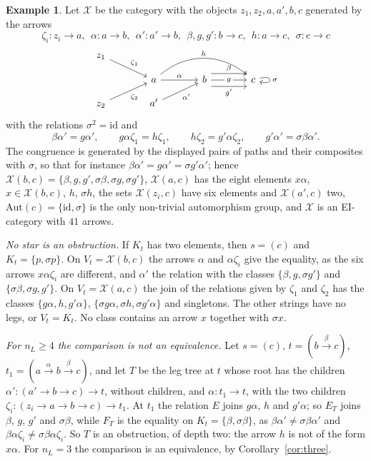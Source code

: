 \documentclass[11pt]{amsart}
\theoremstyle{definition}
\newtheorem{ex}[thm]{Example}
\newcommand{\Aut}{\mathrm{Aut}}
\newcommand{\cX}{\mathcal X}
\newcommand{\id}{\mathrm{id}}
\begin{document}
\begin{ex}\label{ex:deep}
Let $\cX$ be the category with the objects $z_1,z_2,a,a',b,c$
generated by the arrows
\[
\zeta_i\colon z_i\to a,\ \ \alpha\colon a\to b,\ \ \alpha'\colon
a'\to b,\ \ \beta,g,g'\colon b\to c,\ \ h\colon a\to c,\ \
\sigma\colon c\to c
\]
\[
\begin{tikzcd}[column sep=large,row sep=small]
z_1\ar[dr,"\zeta_1"]&&&\\
&a\ar[r,"\alpha"]\ar[rr,bend left=40,"h"]&b\ar[r,shift left=1.5ex,"\beta"]
\ar[r,"g" description]\ar[r,shift right=1.5ex,"g'"']&c\ar[loop right,"\sigma"]\\
z_2\ar[ur,"\zeta_2"']&a'\ar[ur,"\alpha'"']&&
\end{tikzcd}
\]
with the relations $\sigma^2=\id$ and
\[
\beta\alpha'=g\alpha',\qquad g\alpha\zeta_1=h\zeta_1,\qquad
h\zeta_2=g'\alpha\zeta_2,\qquad g'\alpha'=\sigma\beta\alpha'.
\]
The congruence is generated by the displayed pairs of paths and their
composites with $\sigma$, so that for instance $\beta\alpha'=g\alpha'=
\sigma g'\alpha'$; hence $\cX(b,c)=\{\beta,g,g',\sigma\beta,
\sigma g,\sigma g'\}$, $\cX(a,c)$ has the eight elements $x\alpha$,
$x\in\cX(b,c)$, $h$, $\sigma h$, the sets $\cX(z_i,c)$ have six
elements and $\cX(a',c)$ two, $\Aut(c)=\{\id,\sigma\}$ is the only
non-trivial automorphism group, and $\cX$ is an EI-category with $41$
arrows.

\emph{No star is an obstruction.} If $K_t$ has two
elements, then $s=(c)$ and $K_t=\{p,\sigma p\}$. On $V_t=\cX(b,c)$ the
arrows $\alpha$ and $\alpha\zeta_i$ give the equality, as the six
arrows $x\alpha\zeta_i$ are different, and $\alpha'$ the relation with
the classes $\{\beta,g,\sigma g'\}$ and $\{\sigma\beta,\sigma g,g'\}$.
On $V_t=\cX(a,c)$ the join of the relations given by $\zeta_1$ and
$\zeta_2$ has the classes $\{g\alpha,h,g'\alpha\}$, $\{\sigma g\alpha,
\sigma h,\sigma g'\alpha\}$ and singletons. The other strings have no
legs, or $V_t=K_t$. No class contains an arrow $x$ together with
$\sigma x$.

\emph{For $n_L\ge4$ the comparison is not an equivalence.} Let
$s=(c)$, $t=(b\xrightarrow{\beta}c)$, $t_1=(a\xrightarrow{\alpha}b
\xrightarrow{\beta}c)$, and let $T$ be the leg tree at $t$ whose root
has the children $\alpha'\colon(a'\to b\to c)\to t$, without children,
and $\alpha\colon t_1\to t$, with the two children $\zeta_i\colon
(z_i\to a\to b\to c)\to t_1$. At $t_1$ the relation $E$ joins
$g\alpha$, $h$ and $g'\alpha$; so $E_T$ joins $\beta$, $g$, $g'$ and
$\sigma\beta$, while $F_T$ is the equality on $K_t=\{\beta,\sigma
\beta\}$, as $\beta\alpha'\ne\sigma\beta\alpha'$ and $\beta\alpha
\zeta_i\ne\sigma\beta\alpha\zeta_i$. So $T$ is an obstruction, of depth two: the
arrow $h$ is not of the form $x\alpha$. For $n_L=3$ the comparison is
an equivalence, by Corollary~\ref{cor:three}.
\end{ex}
\end{document}
